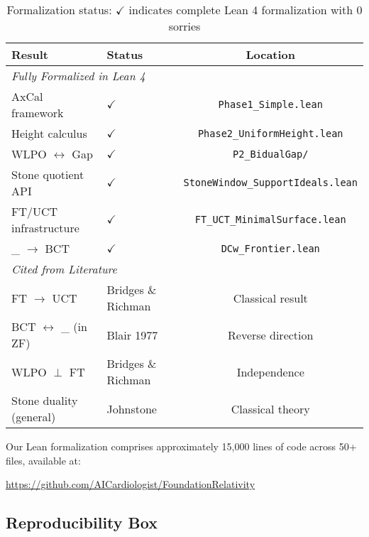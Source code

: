 \documentclass[11pt]{article}
\theoremstyle{definition}
\theoremstyle{remark}
\newcommand{\DCw}{\mathrm{DC}_\omega}
\begin{document}
\begin{table}[h]
\centering
\begin{tabular}{llc}
\hline
\textbf{Result} & \textbf{Status} & \textbf{Location} \\
\hline
\multicolumn{3}{l}{\textit{Fully Formalized in Lean 4}} \\
AxCal framework & $\checkmark$ & \texttt{Phase1\_Simple.lean} \\
Height calculus & $\checkmark$ & \texttt{Phase2\_UniformHeight.lean} \\
WLPO $\leftrightarrow$ Gap & $\checkmark$ & \texttt{P2\_BidualGap/} \\
Stone quotient API & $\checkmark$ & \texttt{StoneWindow\_SupportIdeals.lean} \\
FT/UCT infrastructure & $\checkmark$ & \texttt{FT\_UCT\_MinimalSurface.lean} \\
\DCw{} $\rightarrow$ BCT & $\checkmark$ & \texttt{DCw\_Frontier.lean} \\
\hline
\multicolumn{3}{l}{\textit{Cited from Literature}} \\
FT $\rightarrow$ UCT & Bridges \& Richman & Classical result \\
BCT $\leftrightarrow$ \DCw{} (in ZF) & Blair 1977 & Reverse direction \\
WLPO $\perp$ FT & Bridges \& Richman & Independence \\
Stone duality (general) & Johnstone & Classical theory \\
\hline
\end{tabular}
\caption{Formalization status: $\checkmark$ indicates complete Lean 4 formalization with 0 sorries}
\label{tab:verification}
\end{table}

Our Lean formalization comprises approximately 15,000 lines of code across 50+ files, available at:
\begin{center}
\url{https://github.com/AICardiologist/FoundationRelativity}
\end{center}

\subsection{Reproducibility Box}
\end{document}
